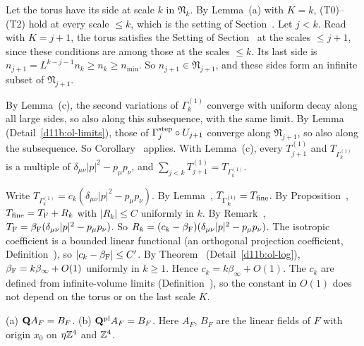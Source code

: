 \begin{step}
Let the torus have its side at scale $k$ in $\mathfrak N_k$. By Lemma~(a) with $K=k$, (T0)--(T2) hold at every scale $\le k$, which is the setting of Section~. Let $j<k$. Read with $K=j+1$, the torus satisfies the Setting of Section~ at the scales $\le j+1$, since these conditions are among those at the scales $\le k$. Its last side is $n_{j+1}=L^{k-j-1}n_k\ge n_k\ge n_{\min}$. So $n_{j+1}\in\mathfrak N_{j+1}$, and these sides form an infinite subset of $\mathfrak N_{j+1}$.
\end{step}

\begin{step}
By Lemma~(c), the second variations of $\Gamma^{(1)}_k$ converge with uniform decay along all large sides, so also along this subsequence, with the same limit. By Lemma~ (Detail~\ref{d11b:ol-limits}), those of $\Gamma^{\rm step}_j\circ U_{j+1}$ converge along $\mathfrak N_{j+1}$, so also along the subsequence. So Corollary~ applies. With Lemma~(c), every $T^{(1)}_{j+1}$ and $T_{\Gamma^{(1)}_k}$ is a multiple of $\delta_{\mu\nu}|p|^2-p_\mu p_\nu$, and $\sum_{j<k}T^{(1)}_{j+1}=T_{\Gamma^{(1)}_k}$.
\end{step}

\begin{step}
Write $T_{\Gamma^{(1)}_k}=c_k(\delta_{\mu\nu}|p|^2-p_\mu p_\nu)$. By Lemma~, $T_{\Gamma^{(1)}_k}=T_{\rm fine}$. By Proposition~, $T_{\rm fine}=T_{\rm F}+R_k$ with $|R_k|\le C$ uniformly in $k$. By Remark~, $T_{\rm F}=\beta_{\rm F}(\delta_{\mu\nu}|p|^2-p_\mu p_\nu)$. So $R_k=(c_k-\beta_{\rm F})(\delta_{\mu\nu}|p|^2-p_\mu p_\nu)$. The isotropic coefficient is a bounded linear functional (an orthogonal projection coefficient, Definition~), so $|c_k-\beta_{\rm F}|\le C'$. By Theorem~ (Detail~\ref{d11b:ol-log}), $\beta_{\rm F}=k\beta_\infty+O(1)$ uniformly in $k\ge1$. Hence $c_k=k\beta_\infty+O(1)$. The $c_k$ are defined from infinite-volume limits (Definition~), so the constant in $O(1)$ does not depend on the torus or on the last scale $K$.
\end{step}

\begin{detail}\label{d11b:ol-linear-average}
(a) $\mathbf Q A_F=B_F$. (b) $\mathbf Q^{\rm pl}A_F=B_F$. Here $A_F$, $B_F$ are the linear fields of $F$ with origin $x_0$ on $\eta\mathbb Z^4$ and $\mathbb Z^4$.
\end{detail}

